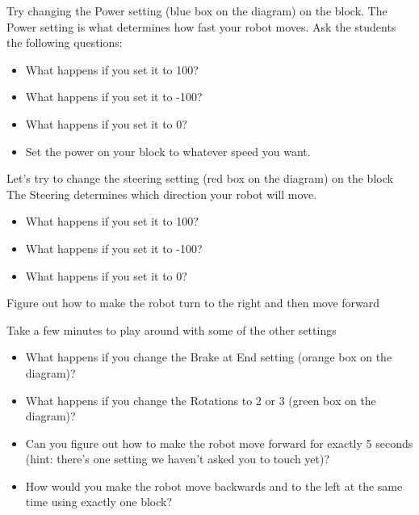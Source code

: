\documentclass{lessonplan}
\begin{document}
    Try changing the Power setting (blue box on the diagram) on the block.
    The Power setting is what determines how fast your robot moves. Ask the students the following questions:
    \begin{itemize}
        \item What happens if you set it to 100?
        \item What happens if you set it to -100?
        \item What happens if you set it to 0?
        \item Set the power on your block to whatever speed you want.
    \end{itemize}
    \par
    Let’s try to change the steering setting (red box on the diagram) on the block
    The Steering determines which direction your robot will move.
    \begin{itemize}
        \item What happens if you set it to 100?
        \item What happens if you set it to -100?
        \item What happens if you set it to 0?
    \end{itemize}
    \par
    Figure out how to make the robot turn to the right and then move forward
    \par
    Take a few minutes to play around with some of the other settings
    \begin{itemize}
        \item What happens if you change the Brake at End setting (orange box on the diagram)?
        \item What happens if you change the Rotations to 2 or 3 (green box on the diagram)?
        \item Can you figure out how to make the robot move forward for exactly 5 seconds (hint: there’s one setting we haven’t asked you to touch yet)?
        \item  How would you make the robot move backwards and to the left at the same time using exactly one block?
    \end{itemize}
\end{document}
